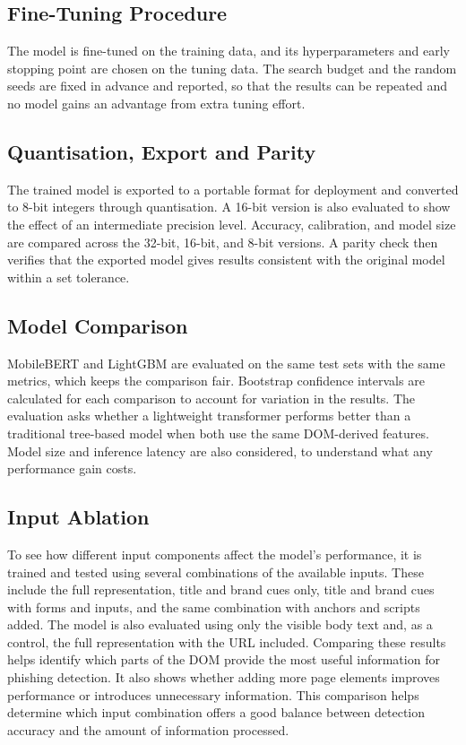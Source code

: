 \documentclass{FastFyp}
\begin{document}
\subsection{Fine-Tuning Procedure}
The model is fine-tuned on the training data, and its hyperparameters and early stopping point are chosen on the tuning data. The search budget and the random seeds are fixed in advance and reported, so that the results can be repeated and no model gains an advantage from extra tuning effort.

\subsection{Quantisation, Export and Parity}
The trained model is exported to a portable format for deployment and converted to 8-bit integers through quantisation. A 16-bit version is also evaluated to show the effect of an intermediate precision level. Accuracy, calibration, and model size are compared across the 32-bit, 16-bit, and 8-bit versions. A parity check then verifies that the exported model gives results consistent with the original model within a set tolerance.

\subsection{Model Comparison}
MobileBERT and LightGBM are evaluated on the same test sets with the same metrics, which keeps the comparison fair. Bootstrap confidence intervals are calculated for each comparison to account for variation in the results. The evaluation asks whether a lightweight transformer performs better than a traditional tree-based model when both use the same DOM-derived features. Model size and inference latency are also considered, to understand what any performance gain costs.

\subsection{Input Ablation}
To see how different input components affect the model's performance, it is trained and tested using several combinations of the available inputs. These include the full representation, title and brand cues only, title and brand cues with forms and inputs, and the same combination with anchors and scripts added. The model is also evaluated using only the visible body text and, as a control, the full representation with the URL included. Comparing these results helps identify which parts of the DOM provide the most useful information for phishing detection. It also shows whether adding more page elements improves performance or introduces unnecessary information. This comparison helps determine which input combination offers a good balance between detection accuracy and the amount of information processed.
\end{document}
